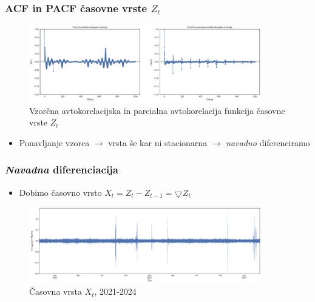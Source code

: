 \documentclass[14p, hyperref={unicode}]{beamer}
\begin{document}


\begin{frame}
    
    \frametitle{ACF in PACF časovne vrste $Z_t$} 

    \begin{figure}[h!]
        \centering
        \caption{Vzorčna avtokorelacijska in parcialna avtokorelacija funkcija časovne vrste $Z_t$}\par\medskip
        \label{fig:ts_diff_acf_pacf}
        \includegraphics[width=0.9\textwidth]{ts_diff_acf_pacf.png}
    \end{figure}

    \begin{itemize}
        \item Ponavljanje vzorca $\rightarrow$ vrsta še kar ni stacionarna $\rightarrow$ \emph{navadno} diferenciramo
    \end{itemize}
    
\end{frame}




\begin{frame}
    
    \frametitle{\emph{Navadna} diferenciacija} 

    \begin{itemize}
        \item Dobimo časovno vrsto $X_t = Z_t - Z_{t-1} = \bigtriangledown{Z_t}$
    \end{itemize}

    \begin{figure}[h!]
        \centering
        \caption{Časovna vrsta $X_t$, 2021-2024}\par\medskip
        \label{fig:ts_diff_2}
        \includegraphics[width=0.9\textwidth]{ts_diff_2.png}
    \end{figure}
    
\end{frame}
\end{document}
